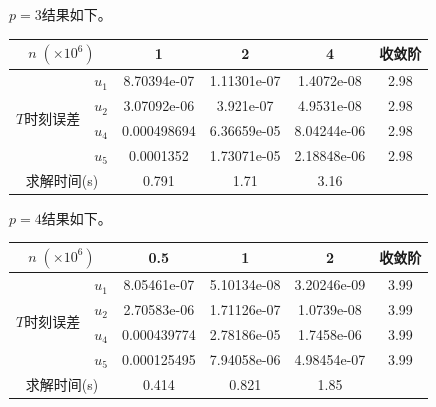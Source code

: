 \documentclass[lang=cn,10pt,bibend=bibtex]{elegantbook}
\begin{document}
$p=3$结果如下。

\vspace{-.5em}
\begin{table}[H]
  \centering
  \renewcommand\arraystretch{0.85}
  \begin{tabular}{cc|ccc|c}
  \multicolumn{2}{c|}{$n\;(\times 10^6)$}                  & 1 & 2 & 4  & 收敛阶 \\ \hline
  \multicolumn{1}{c|}{\multirow{4}{*}{$T$时刻误差}} & \multicolumn{1}{c|}{$u_1$} &  8.70394e-07  &  1.11301e-07  & 1.4072e-08    &  2.98   \\
  \multicolumn{1}{c|}{}                         & \multicolumn{1}{c|}{$u_2$} &   3.07092e-06    & 3.921e-07  & 4.9531e-08    &  2.98   \\
  \multicolumn{1}{c|}{}                         & \multicolumn{1}{c|}{$u_4$} &   0.000498694    & 6.36659e-05  & 8.04244e-06     &  2.98   \\
  \multicolumn{1}{c|}{}                         & \multicolumn{1}{c|}{$u_5$} &   0.0001352   & 1.73071e-05  & 2.18848e-06     &  2.98  \\ \hline
  \multicolumn{2}{c|}{求解时间(s)} & 0.791 & 1.71 & 3.16 & 
  \end{tabular}
\end{table}
\vspace{-.8em}

$p=4$结果如下。

\vspace{-.5em}
\begin{table}[H]
  \centering
  \renewcommand\arraystretch{0.8}
  \begin{tabular}{cc|ccc|c}
  \multicolumn{2}{c|}{$n\;(\times 10^6)$}                  & 0.5 & 1 & 2  & 收敛阶 \\ \hline
  \multicolumn{1}{c|}{\multirow{4}{*}{$T$时刻误差}} & \multicolumn{1}{c|}{$u_1$} &  8.05461e-07  &  5.10134e-08  & 3.20246e-09    &  3.99   \\
  \multicolumn{1}{c|}{}                         & \multicolumn{1}{c|}{$u_2$} &   2.70583e-06    & 1.71126e-07  & 1.0739e-08    &  3.99   \\
  \multicolumn{1}{c|}{}                         & \multicolumn{1}{c|}{$u_4$} &   0.000439774    & 2.78186e-05  & 1.7458e-06     &  3.99   \\
  \multicolumn{1}{c|}{}                         & \multicolumn{1}{c|}{$u_5$} &   0.000125495   & 7.94058e-06  & 4.98454e-07     &  3.99  \\ \hline
  \multicolumn{2}{c|}{求解时间(s)} & 0.414 & 0.821 & 1.85 & 
  \end{tabular}
\end{table}
\vspace{-.8em}
\end{document}
